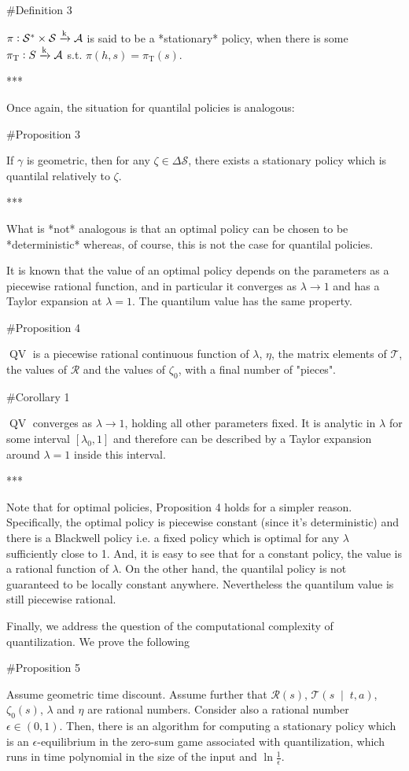\documentclass[a4paper]{article}
\newcommand{\AP}[1]{\left(#1\right)}
\newcommand{\AB}[1]{\left[#1\right]}
\newcommand{\APM}[2]{\left(#1\;\middle\vert\;#2\right)}
\newcommand{\K}{\xrightarrow{\textnormal{k}}}
\newcommand{\A}{\mathcal{A}}
\newcommand{\St}{\mathcal{S}}
\newcommand{\T}{\mathcal{T}}
\newcommand{\R}{\mathcal{R}}
\newcommand{\QV}{\operatorname{QV}}
\begin{document}
\#Definition 3

$\pi: \St^* \times \St \K \A$ is said to be a *stationary* policy, when there is some $\pi_\text{T}: S \K \A$ s.t. $\pi(h,s)=\pi_\text{T}\AP{s}$.

***

Once again, the situation for quantilal policies is analogous:

\#Proposition 3

If $\gamma$ is geometric, then for any $\zeta\in\Delta\St$, there exists a stationary policy which is quantilal relatively to $\zeta$.

***

What is *not* analogous is that an optimal policy can be chosen to be *deterministic* whereas, of course, this is not the case for quantilal policies.

It is known that the value of an optimal policy depends on the parameters as a piecewise rational function, and in particular it converges as $\lambda \rightarrow 1$ and has a Taylor expansion at $\lambda=1$. The quantilum value has the same property.

\#Proposition 4

$\QV$ is a piecewise rational continuous function of $\lambda$, $\eta$, the matrix elements of $\T$, the values of $\R$ and the values of $\zeta_0$, with a final number of "pieces".

\#Corollary 1

$\QV$ converges as $\lambda \rightarrow 1$, holding all other parameters fixed. It is analytic in $\lambda$ for some interval $\AB{\lambda_0,1}$ and therefore can be described by a Taylor expansion around $\lambda=1$ inside this interval.

***

Note that for optimal policies, Proposition 4 holds for a simpler reason. Specifically, the optimal policy is piecewise constant (since it's deterministic) and there is a Blackwell policy i.e. a fixed policy which is optimal for any $\lambda$ sufficiently close to 1. And, it is easy to see that for a constant policy, the value is a rational function of $\lambda$. On the other hand, the quantilal policy is not guaranteed to be locally constant anywhere. Nevertheless the quantilum value is still piecewise rational.

Finally, we address the question of the computational complexity of quantilization. We prove the following

\#Proposition 5

Assume geometric time discount. Assume further that $\R(s)$, $\T\APM{s}{t,a}$, $\zeta_0(s)$, $\lambda$ and $\eta$ are rational numbers. Consider also a rational number $\epsilon\in(0,1)$. Then, there is an algorithm for computing a stationary policy which is an $\epsilon$-equilibrium in the zero-sum game associated with quantilization, which runs in time polynomial in the size of the input and $\ln\frac{1}{\epsilon}$.
\end{document}
